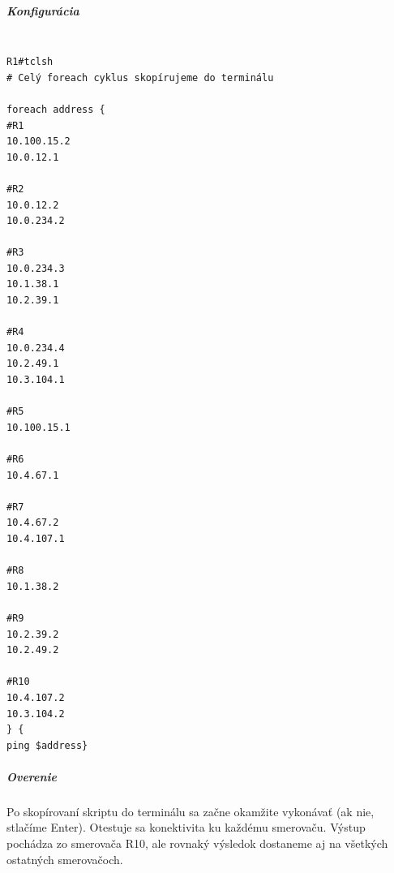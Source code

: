 \documentclass[12pt,twoside,a4paper]{article}
\begin{document}
\subparagraph{Konfigurácia}

\noindent
{\selectfont
\begin{small}
\begin{verbatim}

R1#tclsh
# Celý foreach cyklus skopírujeme do terminálu

foreach address {
#R1
10.100.15.2
10.0.12.1

#R2
10.0.12.2
10.0.234.2

#R3
10.0.234.3
10.1.38.1
10.2.39.1

#R4
10.0.234.4
10.2.49.1
10.3.104.1

#R5
10.100.15.1

#R6
10.4.67.1

#R7
10.4.67.2
10.4.107.1

#R8
10.1.38.2

#R9
10.2.39.2
10.2.49.2

#R10
10.4.107.2
10.3.104.2
} {
ping $address}

\end{verbatim}
\end{small}
}

\subparagraph{Overenie}
\subparagraph{}
Po skopírovaní skriptu do terminálu sa začne okamžite vykonávať (ak nie, stlačíme Enter). Otestuje sa konektivita ku každému smerovaču. Výstup pochádza zo smerovača R10, ale rovnaký výsledok dostaneme aj na všetkých ostatných smerovačoch.
\end{document}

